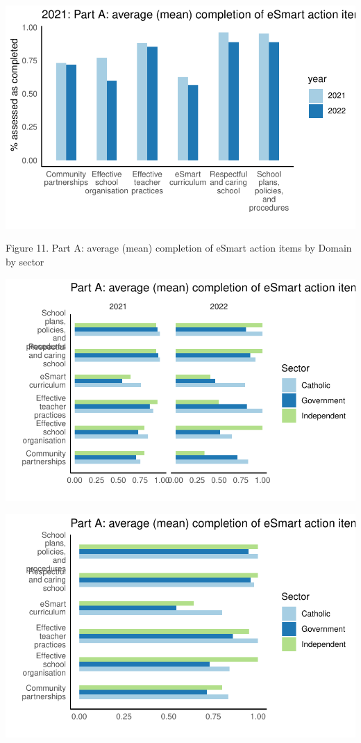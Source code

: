\documentclass[
  letterpaper,
  DIV=11,
  numbers=noendperiod]{scrartcl}
\begin{document}
\includegraphics{report_files/figure-pdf/unnamed-chunk-12-2.pdf}

Figure 11. Part A: average (mean) completion of eSmart action items by
Domain by sector

\includegraphics{report_files/figure-pdf/unnamed-chunk-13-1.pdf}

\includegraphics{report_files/figure-pdf/unnamed-chunk-13-2.pdf}
\end{document}
